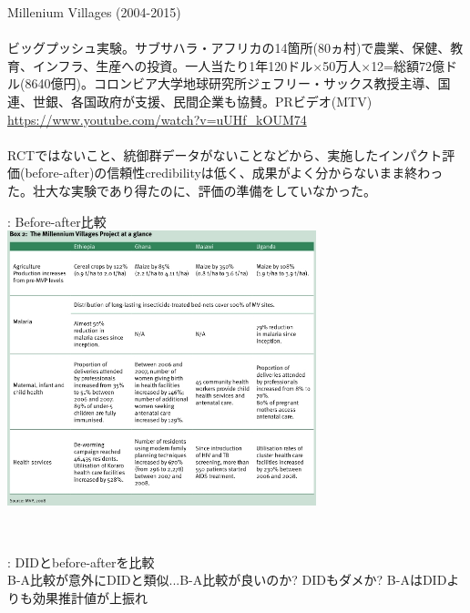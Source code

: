 \begin{frame}{}
Millenium Villages (2004-2015)\\~\\
ビッグプッシュ実験。サブサハラ・アフリカの14箇所(80ヵ村)で農業、保健、教育、インフラ、生産への投資。一人当たり1年120ドル$\times$50万人$\times$12=総額$72$億ドル(8640億円)。コロンビア大学地球研究所ジェフリー・サックス教授主導、国連、世銀、各国政府が支援、民間企業も協賛。PRビデオ(MTV) {\footnotesize\url{https://www.youtube.com/watch?v=uUHf_kOUM74}}\\~\\
\pause
RCTではないこと、統御群データがないことなどから、実施したインパクト評価(before-after)の信頼性credibilityは低く、成果がよく分からないまま終わった。壮大な実験であり得たのに、評価の準備をしていなかった。
\end{frame}

\begin{frame}{}
\citet{ODIMV2008}: Before-after比較\\
\hfil\includegraphics[height = 8cm]{ImpactEvaluation/figure/MVPhase1Evaluation.jpg}
\end{frame}

\begin{frame}{}
\begin{columns}[T]
\column{.7\paperwidth}
\vspace*{-3cm}
\hspace*{1cm}\\
\column{.25\paperwidth}
\citet{ClemensDemombynes2011}: DIDとbefore-afterを比較\\
B-A比較が意外にDIDと類似...B-A比較が良いのか? DIDもダメか? B-AはDIDよりも効果推計値が上振れ
\end{columns} 
\end{frame}

